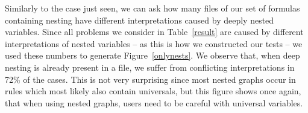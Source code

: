  
Similarly to the case just seen, we can ask how many files  of our set of formulas containing nesting have different interpretations caused by deeply nested variables. Since all problems we consider 
in Table~\ref{result} are caused by different interpretations of nested variables -- as this is how we constructed our tests -- we used these numbers to generate Figure~\ref{onlynests}. 
We observe that, when deep nesting is already present in a file, we suffer from conflicting interpretations in 72\% of the cases.
This is not very surprising since most nested graphs occur in rules which most likely also contain universals, but this figure shows once again, that when using nested graphs, users need to be careful 
with universal variables.

